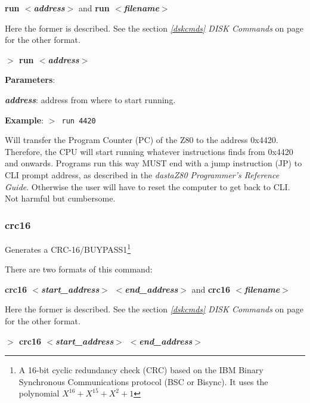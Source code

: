 \documentclass[a4paper,11pt]{article}
\begin{document}
        \textbf{run \textit{$<$address$>$}} and \textbf{run 
        \textit{$<$filename$>$}}
        
        Here the former is described. See the section \textit{\ref{dskcmds}
        DISK Commands} on page \pageref{dskcmds} for the other format.

        \hspace{1.9cm}\textbf{$>$ run \textit{$<$address$>$}}

        \textbf{Parameters}:

        \hspace{1cm}\textbf{\textit{address}}: address from where to start
        running.
        
        \textbf{Example}: \texttt{$>$ run 4420}

        Will transfer the Program Counter (PC) of the Z80 to the address
        0x4420. Therefore, the CPU will start running whatever instructions
        finds from 0x4420 and onwards. Programs run this way MUST end with a
        jump instruction (JP) to CLI prompt address, as described in the
        \textit{dastaZ80 Programmer’s Reference Guide}\cite{dastaz80progref}.
        Otherwise the user will have to reset the computer to get back to CLI.
        Not harmful but cumbersome.

        \subsubsection{{\color{blue}crc16}}
        Generates a CRC-16/BUYPASS1\footnote{A 16-bit cyclic redundancy
        check (CRC) based on the IBM Binary Synchronous Communications
        protocol\cite{ibmbsc} (BSC or Bisync). It uses the polynomial
        $X^{16} + X^{15} +X^2 + 1$}

        There are two formats of this command: 
        
        \textbf{crc16 \textit{$<$start\_address$>$ $<$end\_address$>$}}
        and \textbf{crc16 \textit{$<$filename$>$}} 
        
        Here the former is described. See the section \textit{\ref{dskcmds} 
        DISK Commands} on page \pageref{dskcmds} for the other format.

        \hspace{1.9cm}\textbf{$>$ crc16 \textit{$<$start\_address$>$
        $<$end\_address$>$}}
        
\end{document}
